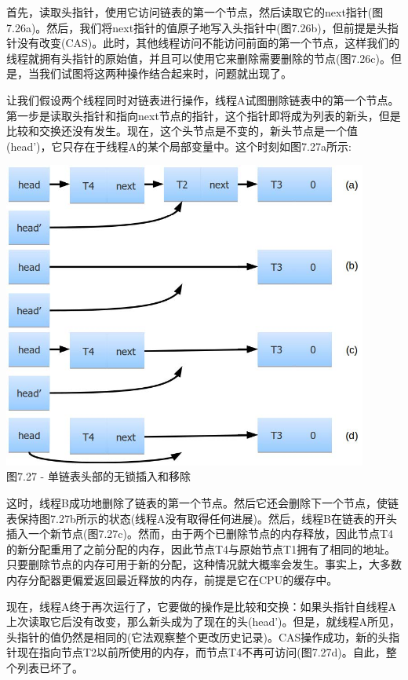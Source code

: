 首先，读取头指针，使用它访问链表的第一个节点，然后读取它的next指针(图7.26a)。然后，我们将next指针的值原子地写入头指针中(图7.26b)，但前提是头指针没有改变(CAS)。此时，其他线程访问不能访问前面的第一个节点，这样我们的线程就拥有头指针的原始值，并且可以使用它来删除需要删除的节点(图7.26c)。但是，当我们试图将这两种操作结合起来时，问题就出现了。

让我们假设两个线程同时对链表进行操作，线程A试图删除链表中的第一个节点。第一步是读取头指针和指向next节点的指针，这个指针即将成为列表的新头，但是比较和交换还没有发生。现在，这个头节点是不变的，新头节点是一个值(head')，它只存在于线程A的某个局部变量中。这个时刻如图7.27a所示:

\begin{center}
\includegraphics[width=0.9\textwidth]{content/2/chapter7/images/27.jpg}\\
图7.27 - 单链表头部的无锁插入和移除
\end{center}

这时，线程B成功地删除了链表的第一个节点。然后它还会删除下一个节点，使链表保持图7.27b所示的状态(线程A没有取得任何进展)。然后，线程B在链表的开头插入一个新节点(图7.27c)。然而，由于两个已删除节点的内存释放，因此节点T4的新分配重用了之前分配的内存，因此节点T4与原始节点T1拥有了相同的地址。只要删除节点的内存可用于新的分配，这种情况就大概率会发生。事实上，大多数内存分配器更偏爱返回最近释放的内存，前提是它在CPU的缓存中。

现在，线程A终于再次运行了，它要做的操作是比较和交换：如果头指针自线程A上次读取它后没有改变，那么新头成为了现在的头(head')。但是，就线程A所见，头指针的值仍然是相同的(它法观察整个更改历史记录)。CAS操作成功，新的头指针现在指向节点T2以前所使用的内存，而节点T4不再可访问(图7.27d)。自此，整个列表已坏了。

